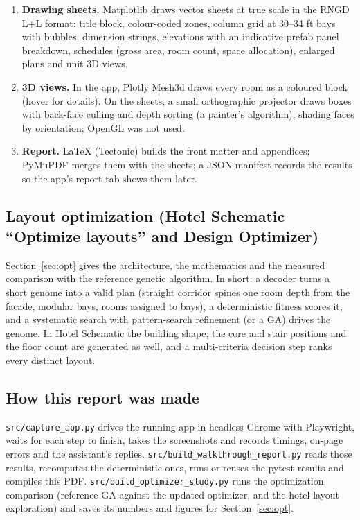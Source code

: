 \documentclass[10pt]{article}
\begin{document}
\begin{enumerate}
\item \textbf{Drawing sheets.} Matplotlib draws vector sheets at true scale in the RNGD L+L format: title block, colour-coded zones, column grid at 30--34 ft bays with bubbles, dimension strings, elevations with an indicative prefab panel breakdown, schedules (gross area, room count, space allocation), enlarged plans and unit 3D views.
\item \textbf{3D views.} In the app, Plotly Mesh3d draws every room as a coloured block (hover for details). On the sheets, a small orthographic projector draws boxes with back-face culling and depth sorting (a painter's algorithm), shading faces by orientation; OpenGL was not used.
\item \textbf{Report.} LaTeX (Tectonic) builds the front matter and appendices; PyMuPDF merges them with the sheets; a JSON manifest records the results so the app's report tab shows them later.
\end{enumerate}

\subsection{Layout optimization (Hotel Schematic ``Optimize layouts'' and Design Optimizer)}
Section~\ref{sec:opt} gives the architecture, the mathematics and the measured comparison with the reference genetic
algorithm. In short: a decoder turns a short genome into a valid plan (straight corridor spines one room depth from the
facade, modular bays, rooms assigned to bays), a deterministic fitness scores it, and a systematic search with pattern-search
refinement (or a GA) drives the genome. In Hotel Schematic the building shape, the core and stair positions and the floor
count are generated as well, and a multi-criteria decision step ranks every distinct layout.

\subsection{How this report was made}
\texttt{src/capture\_app.py} drives the running app in headless Chrome with Playwright, waits for each step to finish, takes the
screenshots and records timings, on-page errors and the assistant's replies. \texttt{src/build\_walkthrough\_report.py}
reads those results, recomputes the deterministic ones, runs or reuses the pytest results and compiles this PDF.
\texttt{src/build\_optimizer\_study.py} runs the optimization comparison (reference GA against the updated optimizer, and the
hotel layout exploration) and saves its numbers and figures for Section~\ref{sec:opt}.
\end{document}
